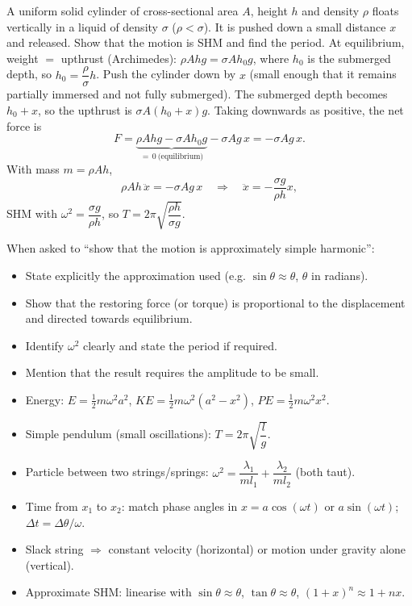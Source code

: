 \documentclass[11pt]{article}
\begin{document}
\begin{exoresolu}
A uniform solid cylinder of cross-sectional area $A$, height $h$ and density $\rho$ floats vertically in a liquid of density $\sigma$ ($\rho < \sigma$). It is pushed down a small distance $x$ and released. Show that the motion is SHM and find the period.
\tcblower
At equilibrium, weight $=$ upthrust (Archimedes): $\rho A h g = \sigma A h_0 g$, where $h_0$ is the submerged depth, so $h_0 = \dfrac{\rho}{\sigma}h$.
Push the cylinder down by $x$ (small enough that it remains partially immersed and not fully submerged). The submerged depth becomes $h_0 + x$, so the upthrust is $\sigma A (h_0 + x) g$. Taking downwards as positive, the net force is
\[
F = \underbrace{\rho A h g - \sigma A h_0 g}_{=\,0\ \text{(equilibrium)}} - \sigma A g\, x = -\sigma A g\, x.
\]
With mass $m = \rho A h$,
\[
\rho A h\, \ddot{x} = -\sigma A g\, x \quad\Rightarrow\quad \ddot{x} = -\frac{\sigma g}{\rho h} x,
\]
SHM with $\omega^2 = \dfrac{\sigma g}{\rho h}$, so $T = 2\pi\sqrt{\dfrac{\rho h}{\sigma g}}$.
\end{exoresolu}

\begin{attention}
When asked to ``show that the motion is approximately simple harmonic'':
\begin{itemize}
\item State explicitly the approximation used (e.g. $\sin\theta \approx \theta$, $\theta$ in radians).
\item Show that the restoring force (or torque) is proportional to the displacement and directed towards equilibrium.
\item Identify $\omega^2$ clearly and state the period if required.
\item Mention that the result requires the amplitude to be small.
\end{itemize}
\end{attention}

\begin{aretenir}
\begin{itemize}
\item Energy: $E = \frac{1}{2}m\omega^2 a^2$, $KE = \frac{1}{2}m\omega^2(a^2-x^2)$, $PE = \frac{1}{2}m\omega^2 x^2$.
\item Simple pendulum (small oscillations): $T = 2\pi\sqrt{\dfrac{l}{g}}$.
\item Particle between two strings/springs: $\omega^2 = \dfrac{\lambda_1}{ml_1} + \dfrac{\lambda_2}{ml_2}$ (both taut).
\item Time from $x_1$ to $x_2$: match phase angles in $x = a\cos(\omega t)$ or $a\sin(\omega t)$; $\Delta t = \Delta\theta/\omega$.
\item Slack string $\Rightarrow$ constant velocity (horizontal) or motion under gravity alone (vertical).
\item Approximate SHM: linearise with $\sin\theta \approx \theta$, $\tan\theta \approx \theta$, $(1+x)^n \approx 1 + nx$.
\end{itemize}
\end{aretenir}
\end{document}
